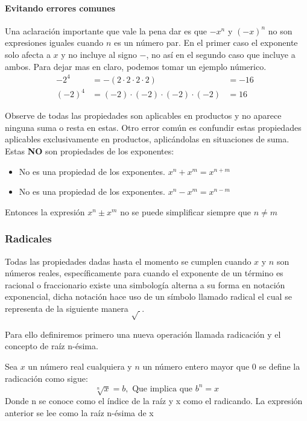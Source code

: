 \documentclass[11pt,letterpaper,oneside]{book}
\numberwithin{equation}{section}
\begin{document}
	\paragraph{Evitando errores comunes}
	Una aclaración importante que vale la pena dar es que $-x^n$ y $(-x)^n$ no son expresiones iguales cuando $n$ es un número par. En el primer caso el exponente solo afecta a $x$ y no incluye al signo $-$, no así en el segundo caso que incluye a ambos. Para dejar mas en claro, podemos tomar un ejemplo númerico.
	\begin{align*}
	-2^4 &= -(2\cdot 2 \cdot 2\cdot 2) &=-16 \\
	(-2)^4 &=(-2)\cdot (-2) \cdot (-2) \cdot (-2) &=16 \phantom{-}
	\end{align*}

	\par Observe de todas las propiedades son aplicables en productos y no aparece ninguna suma o resta en estas. Otro error común es confundir estas propiedades aplicables exclusivamente en productos, aplicándolas en situaciones de suma. Estas \textbf{NO} son propiedades de los exponentes:
	
	\begin{itemize}
		\item No es una propiedad de los exponentes. $x^n+x^m=x^{n+m}$
		\item No es una propiedad de los exponentes. $x^n-x^m=x^{n-m}$
	\end{itemize}

	\par Entonces la expresión $x^n\pm x^m$ no se puede simplificar siempre que $n\neq m$
		
	\subsubsection{Radicales}

	\par
	Todas las propiedades dadas hasta el momento se cumplen cuando $x$ y $n$ son números reales, específicamente para cuando el exponente de un término es racional o fraccionario existe una simbología alterna a su forma en notación exponencial, dicha notación hace uso de un símbolo llamado radical el cual se representa de la siguiente manera $\sqrt{~}$.
	
	\par Para ello definiremos primero una nueva operación llamada radicación y el concepto de raíz n-ésima.
	
	\begin{definición}[Radicación]
		Sea $x$ un número real cualquiera y $n$ un número entero mayor que 0 se define la radicación como sigue:
		\begin{equation*}
		\sqrt[n]{x} = b, \text{ Que implica que } b^n=x  
	\end{equation*}	
		Donde n se conoce como el índice de la raíz y x como el radicando. La expresión anterior se lee como la raíz n-ésima de x
	\end{definición}
\end{document}
